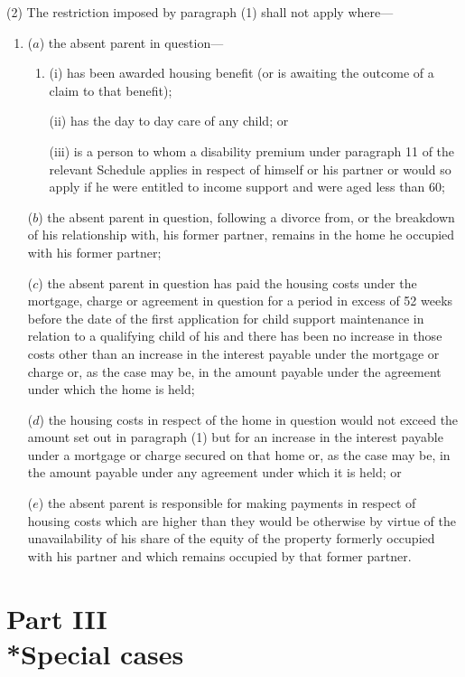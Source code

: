 \documentclass[12pt,a4paper]{article}
\begin{document}
(2) The restriction imposed by paragraph (1) shall not apply where—
\begin{enumerate}\item[]
($a$) the absent parent in question—
\begin{enumerate}\item[]
(i) has been awarded housing benefit (or is awaiting the outcome of a claim to that benefit);

(ii) has the day to day care of any child; or

(iii) is a person to whom a disability premium under paragraph 11 of the relevant Schedule applies in respect of himself or his partner or would so apply if he were entitled to income support and were aged less than 60;
\end{enumerate}

($b$) the absent parent in question, following a divorce from, or the breakdown of his relationship with, his former partner, remains in the home he occupied with his former partner;

($c$) the absent parent in question has paid the housing costs under the mortgage, charge or agreement in question for a period in excess of 52 weeks before the date of the first application for child support maintenance in relation to a qualifying child of his and there has been no increase in those costs other than an increase in the interest payable under the mortgage or charge or, as the case may be, in the amount payable under the agreement under which the home is held;

($d$) the housing costs in respect of the home in question would not exceed the amount set out in paragraph (1) but for an increase in the interest payable under a mortgage or charge secured on that home or, as the case may be, in the amount payable under any agreement under which it is held; or

($e$) the absent parent is responsible for making payments in respect of housing costs which are higher than they would be otherwise by virtue of the unavailability of his share of the equity of the property formerly occupied with his partner and which remains occupied by that former partner.
\end{enumerate}

\section[Part III --- Special cases]{Part III\\*Special cases}
\end{document}
